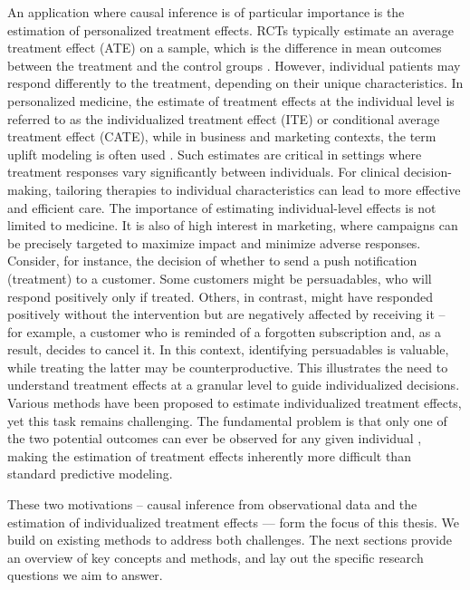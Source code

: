 An application where causal inference is of particular importance is the estimation of personalized treatment effects. RCTs typically estimate an average treatment effect (ATE) on a sample, which is the difference in mean outcomes between the treatment and the control groups \citep{nichols2007}. However, individual patients may respond differently to the treatment, depending on their unique characteristics. 
In personalized medicine, the estimate of treatment effects at the individual level is referred to as the individualized treatment effect (ITE) or conditional average treatment effect (CATE), while in business and marketing contexts, the term uplift modeling is often used \citep{gutierrez2017, zhao2020}. Such estimates are critical in settings where treatment responses vary significantly between individuals. For clinical decision-making, tailoring therapies to individual characteristics can lead to more effective and efficient care. The importance of estimating individual-level effects is not limited to medicine. It is also of high interest in marketing, where campaigns can be precisely targeted to maximize impact and minimize adverse responses. Consider, for instance, the decision of whether to send a push notification (treatment) to a customer. Some customers might be persuadables, who will respond positively only if treated. Others, in contrast, might have responded positively without the intervention but are negatively affected by receiving it -- for example, a customer who is reminded of a forgotten subscription and, as a result, decides to cancel it. In this context, identifying persuadables is valuable, while treating the latter may be counterproductive. This illustrates the need to understand treatment effects at a granular level to guide individualized decisions.
Various methods have been proposed to estimate individualized treatment effects, yet this task remains challenging. The fundamental problem is that only one of the two potential outcomes can ever be observed for any given individual \citep{holland1986}, making the estimation of treatment effects inherently more difficult than standard predictive modeling.


\medskip

These two motivations -- causal inference from observational data and the estimation of individualized treatment effects — form the focus of this thesis. We build on existing methods to address both challenges. The next sections provide an overview of key concepts and methods, and lay out the specific research questions we aim to answer.






